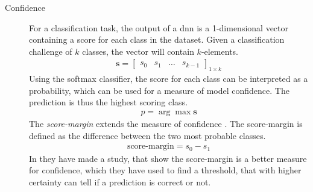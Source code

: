 \begin{description}
	\item[Confidence] For a classification task, the output of a \gls{dnn} is a 1-dimensional vector containing a score for each class in the dataset. Given a classification challenge of $k$ classes, the vector will contain $k$-elements.
	\begin{align*}
	\mathbf{s} = \begin{bmatrix}
	s_0 & s_1 & \dots & s_{k-1}
	\end{bmatrix}_{1 \times k}
	\end{align*}
	Using the softmax classifier, the score for each class can be interpreted as a probability, which can be used for a measure of model confidence. The prediction is thus the highest scoring class. 
	\begin{align*}
	p = \arg\max \mathbf{s}
	\end{align*}
	The \emph{score-margin} extends the measure of confidence \cite{park_big/little_2015}. The score-margin is defined as the difference between the two most probable classes. 
	\begin{align*}
	\mathrm{\text{score-margin}} = s_0 - s_1
	\end{align*}
	In \cite{park_big/little_2015} they have made a study, that show the score-margin is a better measure for confidence, which they have used to find a threshold, that with higher certainty can tell if a prediction is correct or not.  
\end{description}


